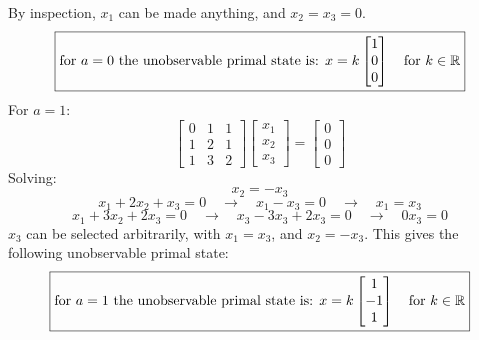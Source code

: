 By inspection, $x_{1}$ can be made anything, and $x_{2}=x_{3}=0$.
\begin{equation*}
  \boxed{%
    \text{for $a=0$ the unobservable primal state is: }x=k
    \begin{bmatrix}
      1 \\
      0 \\
      0
    \end{bmatrix}
    \quad\text{for $k\in\mathbb{R}$}
  }
\end{equation*}
For $a=1$:
\begin{equation*}
  \begin{bmatrix}
    0 & 1 & 1 \\
    1 & 2 & 1 \\
    1 & 3 & 2
  \end{bmatrix}
  \begin{bmatrix}
    x_{1} \\
    x_{2} \\
    x_{3}
  \end{bmatrix}=
  \begin{bmatrix}
    0 \\
    0 \\
    0
  \end{bmatrix}
\end{equation*}
Solving:
\begin{equation*}
  x_{2}=-x_{3}
\end{equation*}
\begin{equation*}
  x_{1}+2x_{2}+x_{3}=0\quad\rightarrow\quad x_{1}-x_{3}=0\quad\rightarrow\quad x_{1}=x_{3}
\end{equation*}
\begin{equation*}
  x_{1}+3x_{2}+2x_{3}=0\quad\rightarrow\quad x_{3}-3x_{3}+2x_{3}=0\quad\rightarrow\quad 0x_{3}=0
\end{equation*}
$x_{3}$ can be selected arbitrarily, with $x_{1}=x_{3}$, and $x_{2}=-x_{3}$.
This gives the following unobservable primal state:
\begin{equation*}
  \boxed{%
    \text{for $a=1$ the unobservable primal state is: }x=k
    \begin{bmatrix}
      1 \\
      -1 \\
      1
    \end{bmatrix}
    \quad\text{for $k\in\mathbb{R}$}
  }
\end{equation*}

